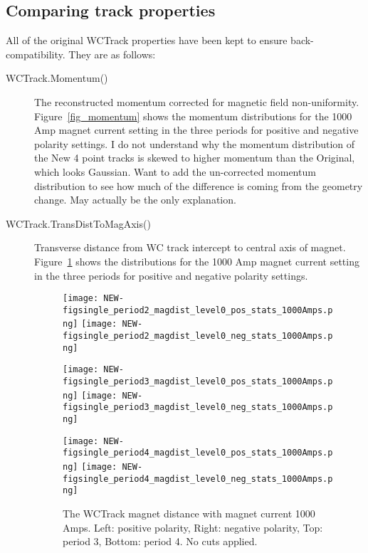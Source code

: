   
  





\subsection{Comparing track properties}





 All of the original WCTrack properties have been kept to ensure back-compatibility. They are as follows:\\
 
 \begin{description}
 
 \item[WCTrack.Momentum()]{
 The reconstructed momentum corrected for magnetic field non-uniformity. Figure~\ref{fig_momentum} shows the momentum distributions for the 1000 Amp magnet current setting in the three periods for positive and negative polarity settings.
 I do not understand why the momentum distribution of the New 4 point tracks is skewed to higher momentum than the Original, which looks Gaussian. Want to add the un-corrected momentum distribution to see how much of the difference is coming from the geometry change. May actually be the only explanation.
 }
 
 
 
 \item[WCTrack.TransDistToMagAxis()]{
Transverse distance from WC track intercept to central axis of magnet. Figure~\ref{fig_magdist} shows the  distributions for the 1000 Amp magnet current setting in the three periods for positive and negative polarity settings.
  \begin{figure}[h]
     	\texttt{[image: NEW-figsingle\_period2\_magdist\_level0\_pos\_stats\_1000Amps.png]}
	 \texttt{[image: NEW-figsingle\_period2\_magdist\_level0\_neg\_stats\_1000Amps.png]}
	 
   	\texttt{[image: NEW-figsingle\_period3\_magdist\_level0\_pos\_stats\_1000Amps.png]}
	 \texttt{[image: NEW-figsingle\_period3\_magdist\_level0\_neg\_stats\_1000Amps.png]}
	 
 	\texttt{[image: NEW-figsingle\_period4\_magdist\_level0\_pos\_stats\_1000Amps.png]}
	 \texttt{[image: NEW-figsingle\_period4\_magdist\_level0\_neg\_stats\_1000Amps.png]}
   \caption[short]{The WCTrack magnet distance with magnet current 1000 Amps. Left: positive polarity, Right: negative polarity, Top: period 3, Bottom: period 4. No cuts applied.}
   \label{fig_magdist}
  \end{figure}
 
}
\end{description}
